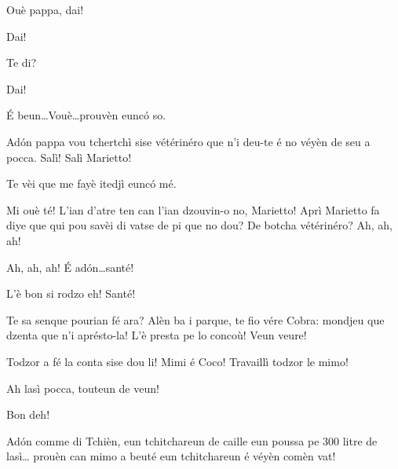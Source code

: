 \begin{drama}
\Simonspeaks Ouè pappa, dai!

\Mariettospeaks {} Dai!

\Cienspeaks Te di?

\Mariettospeaks {} Dai!

\Cienspeaks \'E beun\ldots Vouè\ldots prouvèn eunc\'o so.

\Simonspeaks Ad\'on pappa vou tchertchì sise vétérinéro que n’i deu-te é no véyèn de seu a pocca. Salì! Salì Marietto!


\Mariettospeaks Te vèi que me fayè itedjì eunc\'o mé.

\Cienspeaks Mi ouè té! L’ian d’atre ten can l'ian dzouvin-o no, Marietto! Aprì Marietto fa diye que qui pou savèi di vatse de pi que no dou? De botcha vétérinéro? Ah, ah, ah!

\Mariettospeaks Ah, ah, ah! \'E ad\'on\ldots santé! 


\Cienspeaks L'è bon si rodzo eh! Santé!


\Cienspeaks Te sa senque pourian fé ara? Alèn ba i parque, te fio vére Cobra: mondjeu que dzenta que n'i aprésto-la! L'è presta pe lo concoù! Veun veure!


\Sahlammspeaks {} Todzor a fé la conta sise dou li! Mimi é Coco! Travaillì todzor le mimo!


\Sahlammspeaks Ah lasì pocca, touteun de veun!


\Sahlammspeaks Bon deh!


\Sahlammspeaks Ad\'on comme di Tchièn, eun tchitchareun de caille eun poussa pe 300 litre de lasì\ldots {} prouèn can mimo a beuté eun tchitchareun é véyèn comèn vat!



\end{drama}
